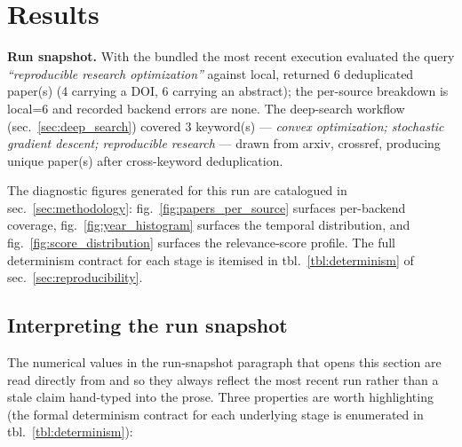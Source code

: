 \documentclass[
  english,
]{article}
\newcounter{none} %
\begin{document}
\newpage

\section{Results}\label{sec:results}

\textbf{Run snapshot.} With the bundled 
the most recent execution evaluated the query \emph{``reproducible
research optimization''} against local, returned 6 deduplicated paper(s)
(4 carrying a DOI, 6 carrying an abstract); the per-source breakdown is
local=6 and recorded backend errors are none. The deep-search workflow
(sec.~\ref{sec:deep_search}) covered 3 keyword(s) --- \emph{convex
optimization; stochastic gradient descent; reproducible research} ---
drawn from arxiv, crossref, producing unique paper(s) after
cross-keyword deduplication.

The diagnostic figures generated for this run are catalogued in
sec.~\ref{sec:methodology}: fig.~\ref{fig:papers_per_source} surfaces
per-backend coverage, fig.~\ref{fig:year_histogram} surfaces the
temporal distribution, and fig.~\ref{fig:score_distribution} surfaces
the relevance-score profile. The full determinism contract for each
stage is itemised in tbl.~\ref{tbl:determinism} of
sec.~\ref{sec:reproducibility}.

\subsection{Interpreting the run
snapshot}\label{interpreting-the-run-snapshot}

The numerical values in the run-snapshot paragraph that opens this
section are read directly from  and
 so they always reflect
the most recent run rather than a stale claim hand-typed into the prose.
Three properties are worth highlighting (the formal determinism contract
for each underlying stage is enumerated in tbl.~\ref{tbl:determinism}):
\end{document}

